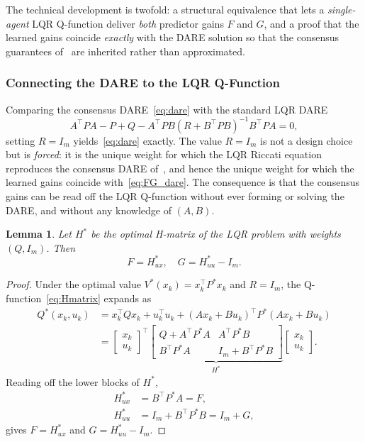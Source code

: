 \documentclass[12pt]{elsarticle}
\newtheorem{lemma}{Lemma}
\theoremstyle{remark}
\begin{document}
The technical development is twofold: a structural equivalence that lets a \emph{single-agent} LQR Q-function deliver \emph{both} predictor gains $F$ and $G$, and a proof that the learned gains coincide \emph{exactly} with the DARE solution so that the consensus guarantees of~\cite{cacace2024} are inherited rather than approximated.

\subsubsection{Connecting the DARE to the LQR Q-Function}
\label{subsec:dare_lqr}

Comparing the consensus DARE~\eqref{eq:dare} with the standard LQR DARE
\begin{equation}
A^\top PA - P + Q - A^\top PB(R + B^\top PB)^{-1}B^\top PA = 0,
\label{eq:dare_lqr}
\end{equation}
setting $R = I_m$ yields~\eqref{eq:dare} exactly. The value $R=I_m$ is not a design choice but is \emph{forced}: it is the unique weight for which the LQR Riccati equation reproduces the consensus DARE of~\cite{cacace2024}, and hence the unique weight for which the learned gains coincide with~\eqref{eq:FG_dare}. The consequence is that the consensus gains can be read off the LQR Q-function without ever forming or solving the DARE, and without any knowledge of $(A,B)$.

\begin{lemma}
\label{prop:FG_recovery}
Let $H^*$ be the optimal H-matrix of the LQR problem with weights $(Q, I_m)$. Then
\begin{equation}
F = H_{ux}^*, \quad G = H_{uu}^* - I_m.
\label{eq:FG_from_H}
\end{equation}
\end{lemma}

\begin{proof}
Under the optimal value $V^*(x_k)=x_k^\top P^* x_k$ and $R=I_m$, the Q-function~\eqref{eq:Hmatrix} expands as
\begin{align*}
Q^*(x_k,u_k)
&= x_k^\top Q x_k + u_k^\top u_k + (Ax_k+Bu_k)^\top P^*(Ax_k+Bu_k)\\
&= \begin{bmatrix} x_k\\ u_k\end{bmatrix}^{\!\top}
\underbrace{\begin{bmatrix} Q+A^\top P^* A & A^\top P^* B\\[1pt] B^\top P^* A & I_m + B^\top P^* B\end{bmatrix}}_{H^*}
\begin{bmatrix} x_k\\ u_k\end{bmatrix}.
\end{align*}
Reading off the lower blocks of $H^*$,
\begin{align*}
H_{ux}^* &= B^\top P^* A = F,\\
H_{uu}^* &= I_m + B^\top P^* B = I_m + G,
\end{align*}
gives $F = H_{ux}^*$ and $G = H_{uu}^* - I_m$.
\end{proof}
\end{document}
